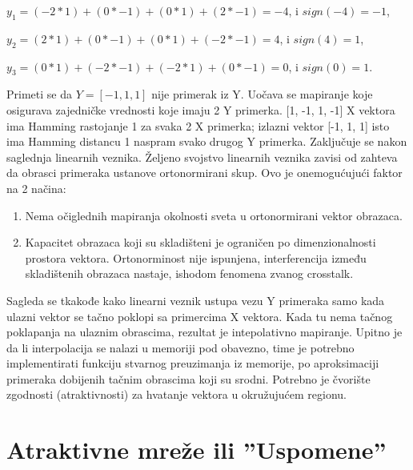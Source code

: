 \documentclass[fontsize=11bp, paper=a4]{scrarticle}
\begin{document}
$y_1 = (-2*1) + (0*-1) + (0*1) + (2*-1) = -4$, i $sign(-4) = -1$,

$y_2 = (2*1) + (0*-1) + (0*1) + (-2*-1) = 4$, i $sign(4) = 1$,

$y_3 = (0*1) + (-2*-1) + (-2*1) + (0*-1) = 0$, i $sign(0) = 1$.

Primeti se da $Y = [-1, 1, 1]$ nije primerak iz Y. Uočava se mapiranje koje osigurava zajedničke vrednosti koje imaju 2 Y primerka. [1, -1, 1, -1] X vektora ima Hamming rastojanje 1 za svaka 2 X primerka; izlazni vektor [-1, 1, 1] isto ima Hamming distancu 1 naspram svako drugog Y primerka. Zaključuje se nakon saglednja linearnih veznika. Željeno svojstvo linearnih veznika zavisi od zahteva da obrasci primeraka ustanove ortonormirani skup. Ovo je onemogućujući faktor na 2 načina:
\begin{enumerate}
    \item Nema očiglednih mapiranja okolnosti sveta u ortonormirani vektor obrazaca.
    \item Kapacitet obrazaca koji su skladišteni je ograničen po dimenzionalnosti prostora vektora. Ortonorminost nije ispunjena, interferencija između skladištenih obrazaca nastaje, ishodom fenomena zvanog crosstalk.
\end{enumerate}
Sagleda se tkakođe kako linearni veznik ustupa vezu Y primeraka samo kada ulazni vektor se tačno poklopi sa primercima X vektora. Kada tu nema tačnog poklapanja na ulaznim obrascima, rezultat je intepolativno mapiranje. Upitno je da li interpolacija se nalazi u memoriji pod obavezno, time je potrebno implementirati funkciju stvarnog preuzimanja iz memorije, po aproksimaciji primeraka dobijenih tačnim obrascima koji su srodni. Potrebno je čvorište zgodnosti (atraktivnosti) za hvatanje vektora u okružujućem regionu.

\section{Atraktivne mreže ili ''Uspomene''}
\end{document}
